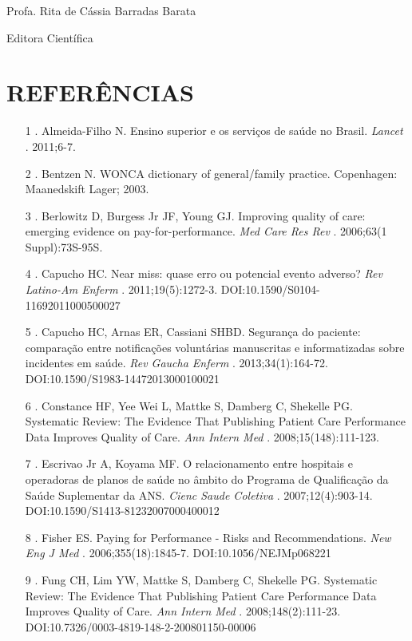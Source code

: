 \documentclass{article}
\begin{document}
Profa. Rita de Cássia Barradas Barata

Editora Científica

\section{REFERÊNCIAS}
\begin{itemize}

\item[1] . Almeida-Filho N. Ensino superior e os serviços de saúde no Brasil.
\textit{Lancet}
. 2011;6-7.

\item[2] . Bentzen N. WONCA dictionary of general/family practice. Copenhagen:
Maanedskift Lager; 2003.

\item[3] . Berlowitz D, Burgess Jr JF, Young GJ. Improving quality of care:
emerging
evidence on pay-for-performance. \textit{Med Care Res Rev}
. 2006;63(1
Suppl):73S-95S.

\item[4] . Capucho HC. Near miss: quase erro ou potencial evento adverso?
\textit{Rev
Latino-Am Enferm}
. 2011;19(5):1272-3.
DOI:10.1590/S0104-11692011000500027

\item[5] . Capucho HC, Arnas ER, Cassiani SHBD. Segurança do paciente:
comparação
entre notificações voluntárias manuscritas e informatizadas sobre incidentes em
saúde.
\textit{Rev Gaucha Enferm}
. 2013;34(1):164-72.
DOI:10.1590/S1983-14472013000100021

\item[6] . Constance HF, Yee Wei L, Mattke S, Damberg C, Shekelle PG. Systematic
Review: The Evidence That Publishing Patient Care Performance Data Improves
Quality of
Care. \textit{Ann Intern Med}
. 2008;15(148):111-123.

\item[7] . Escrivao Jr A, Koyama MF. O relacionamento entre hospitais e
operadoras de
planos de saúde no âmbito do Programa de Qualificação da Saúde Suplementar da
ANS.
\textit{Cienc Saude Coletiva}
. 2007;12(4):903-14.
DOI:10.1590/S1413-81232007000400012

\item[8] . Fisher ES. Paying for Performance - Risks and Recommendations.
\textit{New
Eng J Med}
. 2006;355(18):1845-7. DOI:10.1056/NEJMp068221

\item[9] . Fung CH, Lim YW, Mattke S, Damberg C, Shekelle PG. Systematic Review:
The
Evidence That Publishing Patient Care Performance Data Improves Quality of Care.
\textit{Ann Intern Med}
. 2008;148(2):111-23.
DOI:10.7326/0003-4819-148-2-200801150-00006


\end{itemize}
\end{document}
